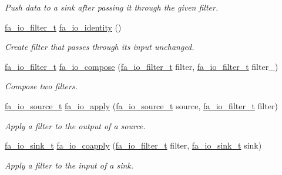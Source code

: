 \begin{DoxyCompactItemize}
\begin{DoxyCompactList}\small\item\em Push data to a sink after passing it through the given filter. \end{DoxyCompactList}\item 
\hyperlink{group___fa_io_ga3e1f11810efcba3b45842e10c1425aba}{fa\-\_\-io\-\_\-filter\-\_\-t} \hyperlink{group___fa_io_gab9e18903ead86c8e6c2cdd190b6412ab}{fa\-\_\-io\-\_\-identity} ()
\begin{DoxyCompactList}\small\item\em Create filter that passes through its input unchanged. \end{DoxyCompactList}\item 
\hyperlink{group___fa_io_ga3e1f11810efcba3b45842e10c1425aba}{fa\-\_\-io\-\_\-filter\-\_\-t} \hyperlink{group___fa_io_gabeb62824d4c0ce4f45b6c901e7aca3ac}{fa\-\_\-io\-\_\-compose} (\hyperlink{group___fa_io_ga3e1f11810efcba3b45842e10c1425aba}{fa\-\_\-io\-\_\-filter\-\_\-t} filter, \hyperlink{group___fa_io_ga3e1f11810efcba3b45842e10c1425aba}{fa\-\_\-io\-\_\-filter\-\_\-t} filter\-\_\-)
\begin{DoxyCompactList}\small\item\em Compose two filters. \end{DoxyCompactList}\item 
\hyperlink{group___fa_io_ga95a53a87c83414434e1afd3097b96ea4}{fa\-\_\-io\-\_\-source\-\_\-t} \hyperlink{group___fa_io_ga1217e66827a628653d8386805039f1d3}{fa\-\_\-io\-\_\-apply} (\hyperlink{group___fa_io_ga95a53a87c83414434e1afd3097b96ea4}{fa\-\_\-io\-\_\-source\-\_\-t} source, \hyperlink{group___fa_io_ga3e1f11810efcba3b45842e10c1425aba}{fa\-\_\-io\-\_\-filter\-\_\-t} filter)
\begin{DoxyCompactList}\small\item\em Apply a filter to the output of a source. \end{DoxyCompactList}\item 
\hyperlink{group___fa_io_ga0d00d1e2c742abdba97597662815ce3a}{fa\-\_\-io\-\_\-sink\-\_\-t} \hyperlink{group___fa_io_ga0b81abcccb362aac530ce0c5be30068f}{fa\-\_\-io\-\_\-coapply} (\hyperlink{group___fa_io_ga3e1f11810efcba3b45842e10c1425aba}{fa\-\_\-io\-\_\-filter\-\_\-t} filter, \hyperlink{group___fa_io_ga0d00d1e2c742abdba97597662815ce3a}{fa\-\_\-io\-\_\-sink\-\_\-t} sink)
\begin{DoxyCompactList}\small\item\em Apply a filter to the input of a sink. \end{DoxyCompactList}\item 

\end{DoxyCompactItemize}
